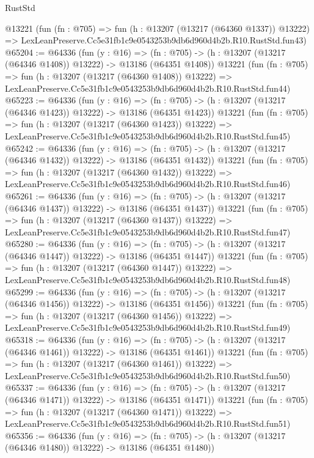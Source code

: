 \begin{lexlean}{RustStd}
\begin{coremodule}
    @13221
    (fun (fn : @705) =>
    fun (h : @13207 (@13217 (@64360 @1337)) @13222) =>
    LexLeanPreserve.Cc5e31fb1c9e0543253b9db6d960d4b2b.R10.RustStd.fun43)
@65204 := @64336
    (fun (y : @16) =>
    (fn : @705) -> (h : @13207 (@13217 (@64346 @1408)) @13222) -> @13186 (@64351 @1408))
    @13221
    (fun (fn : @705) =>
    fun (h : @13207 (@13217 (@64360 @1408)) @13222) =>
    LexLeanPreserve.Cc5e31fb1c9e0543253b9db6d960d4b2b.R10.RustStd.fun44)
@65223 := @64336
    (fun (y : @16) =>
    (fn : @705) -> (h : @13207 (@13217 (@64346 @1423)) @13222) -> @13186 (@64351 @1423))
    @13221
    (fun (fn : @705) =>
    fun (h : @13207 (@13217 (@64360 @1423)) @13222) =>
    LexLeanPreserve.Cc5e31fb1c9e0543253b9db6d960d4b2b.R10.RustStd.fun45)
@65242 := @64336
    (fun (y : @16) =>
    (fn : @705) -> (h : @13207 (@13217 (@64346 @1432)) @13222) -> @13186 (@64351 @1432))
    @13221
    (fun (fn : @705) =>
    fun (h : @13207 (@13217 (@64360 @1432)) @13222) =>
    LexLeanPreserve.Cc5e31fb1c9e0543253b9db6d960d4b2b.R10.RustStd.fun46)
@65261 := @64336
    (fun (y : @16) =>
    (fn : @705) -> (h : @13207 (@13217 (@64346 @1437)) @13222) -> @13186 (@64351 @1437))
    @13221
    (fun (fn : @705) =>
    fun (h : @13207 (@13217 (@64360 @1437)) @13222) =>
    LexLeanPreserve.Cc5e31fb1c9e0543253b9db6d960d4b2b.R10.RustStd.fun47)
@65280 := @64336
    (fun (y : @16) =>
    (fn : @705) -> (h : @13207 (@13217 (@64346 @1447)) @13222) -> @13186 (@64351 @1447))
    @13221
    (fun (fn : @705) =>
    fun (h : @13207 (@13217 (@64360 @1447)) @13222) =>
    LexLeanPreserve.Cc5e31fb1c9e0543253b9db6d960d4b2b.R10.RustStd.fun48)
@65299 := @64336
    (fun (y : @16) =>
    (fn : @705) -> (h : @13207 (@13217 (@64346 @1456)) @13222) -> @13186 (@64351 @1456))
    @13221
    (fun (fn : @705) =>
    fun (h : @13207 (@13217 (@64360 @1456)) @13222) =>
    LexLeanPreserve.Cc5e31fb1c9e0543253b9db6d960d4b2b.R10.RustStd.fun49)
@65318 := @64336
    (fun (y : @16) =>
    (fn : @705) -> (h : @13207 (@13217 (@64346 @1461)) @13222) -> @13186 (@64351 @1461))
    @13221
    (fun (fn : @705) =>
    fun (h : @13207 (@13217 (@64360 @1461)) @13222) =>
    LexLeanPreserve.Cc5e31fb1c9e0543253b9db6d960d4b2b.R10.RustStd.fun50)
@65337 := @64336
    (fun (y : @16) =>
    (fn : @705) -> (h : @13207 (@13217 (@64346 @1471)) @13222) -> @13186 (@64351 @1471))
    @13221
    (fun (fn : @705) =>
    fun (h : @13207 (@13217 (@64360 @1471)) @13222) =>
    LexLeanPreserve.Cc5e31fb1c9e0543253b9db6d960d4b2b.R10.RustStd.fun51)
@65356 := @64336
    (fun (y : @16) =>
    (fn : @705) -> (h : @13207 (@13217 (@64346 @1480)) @13222) -> @13186 (@64351 @1480))

\end{coremodule}
\end{lexlean}
